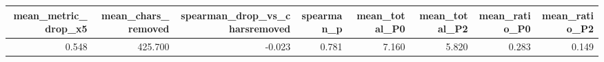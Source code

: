 \begin{tabular}{rrrrrrrr}
\toprule
mean_metric_drop_x5 & mean_chars_removed & spearman_drop_vs_charsremoved & spearman_p & mean_total_P0 & mean_total_P2 & mean_ratio_P0 & mean_ratio_P2 \\
\midrule
0.548 & 425.700 & -0.023 & 0.781 & 7.160 & 5.820 & 0.283 & 0.149 \\
\bottomrule
\end{tabular}
